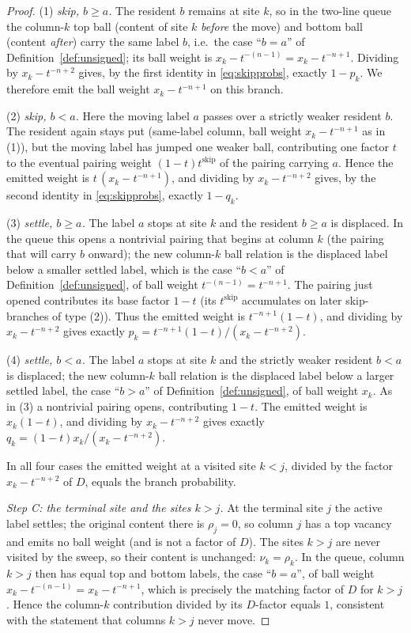 \begin{proof}
\smallskip
\noindent(1) \emph{skip, $b\ge a$.} The resident $b$ remains at site $k$, so in
the two-line queue the column-$k$ top ball (content of site $k$ \emph{before} the
move) and bottom ball (content \emph{after}) carry the same label $b$, i.e.\ the
case ``$b=a$'' of Definition~\ref{def:unsigned}; its ball weight is
$x_k-t^{-(n-1)}=x_k-t^{-n+1}$. Dividing by $x_k-t^{-n+2}$ gives, by the first
identity in \eqref{eq:skipprobs}, exactly $1-p_k$. We therefore emit the ball
weight $x_k-t^{-n+1}$ on this branch.

\smallskip
\noindent(2) \emph{skip, $b<a$.} Here the moving label $a$ passes over a strictly
weaker resident $b$. The resident again stays put (same-label column, ball weight
$x_k-t^{-n+1}$ as in (1)), but the moving label has jumped one weaker ball,
contributing one factor $t$ to the eventual pairing weight $(1-t)t^{\mathrm{skip}}$
of the pairing carrying $a$. Hence the emitted weight is $t\,(x_k-t^{-n+1})$, and
dividing by $x_k-t^{-n+2}$ gives, by the second identity in \eqref{eq:skipprobs},
exactly $1-q_k$.

\smallskip
\noindent(3) \emph{settle, $b\ge a$.} The label $a$ stops at site $k$ and the
resident $b\ge a$ is displaced. In the queue this opens a nontrivial pairing
that begins at column $k$ (the pairing that will carry $b$ onward); the new
column-$k$ ball relation is the displaced label below a smaller settled label,
which is the case ``$b<a$'' of Definition~\ref{def:unsigned}, of ball weight
$t^{-(n-1)}=t^{-n+1}$. The pairing just opened contributes its base factor
$1-t$ (its $t^{\mathrm{skip}}$ accumulates on later skip-branches of type (2)).
Thus the emitted weight is $t^{-n+1}(1-t)$, and dividing by $x_k-t^{-n+2}$ gives
exactly $p_k=t^{-n+1}(1-t)/(x_k-t^{-n+2})$.

\smallskip
\noindent(4) \emph{settle, $b<a$.} The label $a$ stops at site $k$ and the
strictly weaker resident $b<a$ is displaced; the new column-$k$ ball relation is
the displaced label below a larger settled label, the case ``$b>a$'' of
Definition~\ref{def:unsigned}, of ball weight $x_k$. As in (3) a nontrivial
pairing opens, contributing $1-t$. The emitted weight is $x_k(1-t)$, and dividing
by $x_k-t^{-n+2}$ gives exactly $q_k=(1-t)x_k/(x_k-t^{-n+2})$.

\smallskip
In all four cases the emitted weight at a visited site $k<j$, divided by the
factor $x_k-t^{-n+2}$ of $D$, equals the branch probability.

\medskip
\noindent\emph{Step C: the terminal site and the sites $k>j$.}
At the terminal site $j$ the active label settles; the original content there is
$\rho_j=0$, so column $j$ has a top vacancy and emits no ball weight (and is not a
factor of $D$). The sites $k>j$ are never visited by the sweep, so their content
is unchanged: $\nu_k=\rho_k$. In the queue, column $k>j$ then has equal top and
bottom labels, the case ``$b=a$'', of ball weight $x_k-t^{-(n-1)}=x_k-t^{-n+1}$,
which is precisely the matching factor of $D$ for $k>j$. Hence the column-$k$
contribution divided by its $D$-factor equals $1$, consistent with the statement
that columns $k>j$ never move.


\end{proof}
